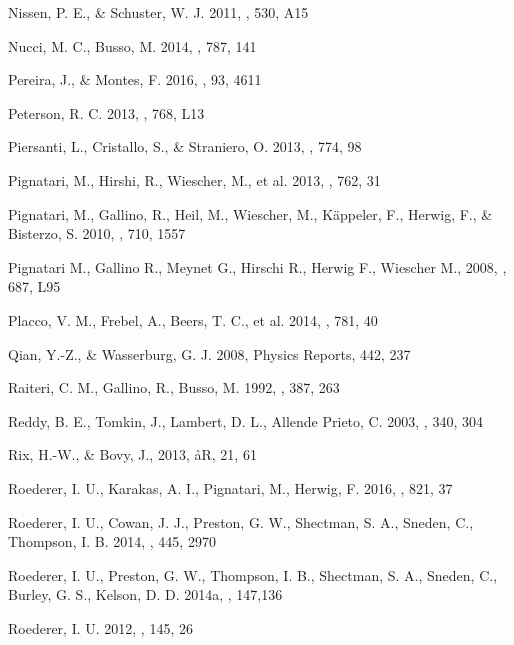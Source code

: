 \documentclass[manuscript]{aastex}
\begin{document}
\begin{thebibliography}{}
Nissen, P. E., \& Schuster, W. J. 2011, \aap, 530, A15

Nucci, M. C., Busso, M. 2014, \apj, 787, 141

Pereira, J., \& Montes, F. 2016, \prc, 93, 4611

Peterson, R. C. 2013, \apjl, 768, L13

Piersanti, L., Cristallo, S., \& Straniero, O. 2013, \apj, 774, 98

Pignatari, M., Hirshi, R., Wiescher, M., et al. 2013, \apj, 762, 31

Pignatari, M., Gallino, R., Heil, M., Wiescher, M., K{\"a}ppeler, F., Herwig, F.,
\& Bisterzo, S. 2010, \apj, 710, 1557

Pignatari M., Gallino R., Meynet G., Hirschi R., Herwig F., Wiescher M.,
2008, \apj, 687, L95

Placco, V. M., Frebel, A., Beers, T. C., et al. 2014, \apj, 781, 40

Qian, Y.-Z., \& Wasserburg, G. J. 2008, Physics Reports, 442, 237

Raiteri, C. M., Gallino, R., Busso, M. 1992, \apj, 387, 263

Reddy, B. E., Tomkin, J., Lambert, D. L., Allende Prieto, C. 2003, \mnras,
340, 304

Rix, H.-W., \& Bovy, J., 2013, \aa R, 21, 61

Roederer, I. U., Karakas, A. I., Pignatari, M., Herwig, F. 2016, \apj,
821, 37

Roederer, I. U., Cowan, J. J., Preston, G. W., Shectman, S. A., Sneden, C.,
Thompson, I. B. 2014, \mnras, 445, 2970

Roederer, I. U., Preston, G. W., Thompson, I. B., Shectman, S. A., Sneden, C.,
Burley, G. S., Kelson, D. D. 2014a, \aj, 147,136

Roederer, I. U. 2012, \apj, 145, 26


\end{thebibliography}
\end{document}
